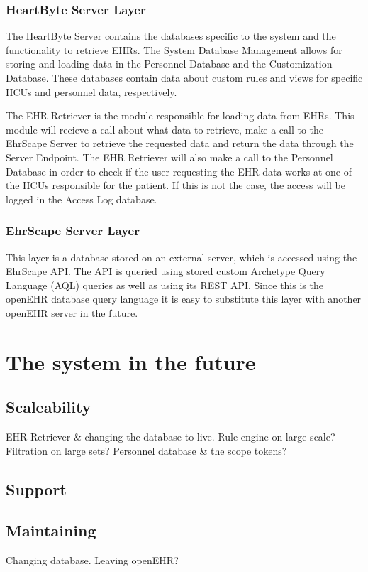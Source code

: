 \documentclass{article}
\begin{document}
\subsubsection{HeartByte Server Layer}
The HeartByte Server contains the databases specific to the system and the functionality to retrieve EHRs. The System Database Management allows for storing and loading data in the Personnel Database and the Customization Database. These databases contain data about custom rules and views for specific HCUs and personnel data, respectively.

The EHR Retriever is the module responsible for loading data from EHRs. This module will recieve a call about what data to retrieve, make a call to the EhrScape Server to retrieve the requested data and return the data through the Server Endpoint. The EHR Retriever will also make a call to the Personnel Database in order to check if the user requesting the EHR data works at one of the HCUs responsible for the patient. If this is not the case, the access will be logged in the Access Log database.

\subsubsection{EhrScape Server Layer}
This layer is a database stored on an external server, which is accessed using the EhrScape API. The API is queried using stored custom Archetype Query Language (AQL) queries as well as using its REST API. Since this is the openEHR database query language it is easy to substitute this layer with another openEHR server in the future.


\section{The system in the future}

\subsection{Scaleability}
EHR Retriever & changing the database to live. Rule engine on large scale? Filtration on large sets? Personnel database & the scope tokens?
\subsection{Support}
\subsection{Maintaining}
Changing database. Leaving openEHR? 
\end{document}
